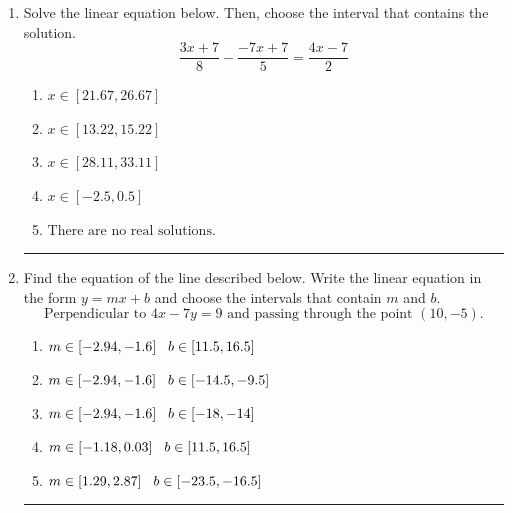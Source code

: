 \documentclass[14pt]{extbook}
\newcommand{\litem}[1]{\item#1\hspace*{-1cm}\rule{\textwidth}{0.4pt}}
\begin{document}
\begin{enumerate}
\litem{
Solve the linear equation below. Then, choose the interval that contains the solution.\[ \frac{3x + 7}{8} - \frac{-7x + 7}{5} = \frac{4x -7}{2} \]\begin{enumerate}[label=\Alph*.]
\item \( x \in [21.67, 26.67] \)
\item \( x \in [13.22, 15.22] \)
\item \( x \in [28.11, 33.11] \)
\item \( x \in [-2.5, 0.5] \)
\item \( \text{There are no real solutions.} \)

\end{enumerate} }
\litem{
Find the equation of the line described below. Write the linear equation in the form $ y=mx+b $ and choose the intervals that contain $m$ and $b$.\[ \text{Perpendicular to } 4 x - 7 y = 9 \text{ and passing through the point } (10, -5). \]\begin{enumerate}[label=\Alph*.]
\item \( m \in [-2.94, -1.6] \hspace*{3mm} b \in [11.5, 16.5] \)
\item \( m \in [-2.94, -1.6] \hspace*{3mm} b \in [-14.5, -9.5] \)
\item \( m \in [-2.94, -1.6] \hspace*{3mm} b \in [-18, -14] \)
\item \( m \in [-1.18, 0.03] \hspace*{3mm} b \in [11.5, 16.5] \)
\item \( m \in [1.29, 2.87] \hspace*{3mm} b \in [-23.5, -16.5] \)


\end{enumerate}}
\end{enumerate}
\end{document}
